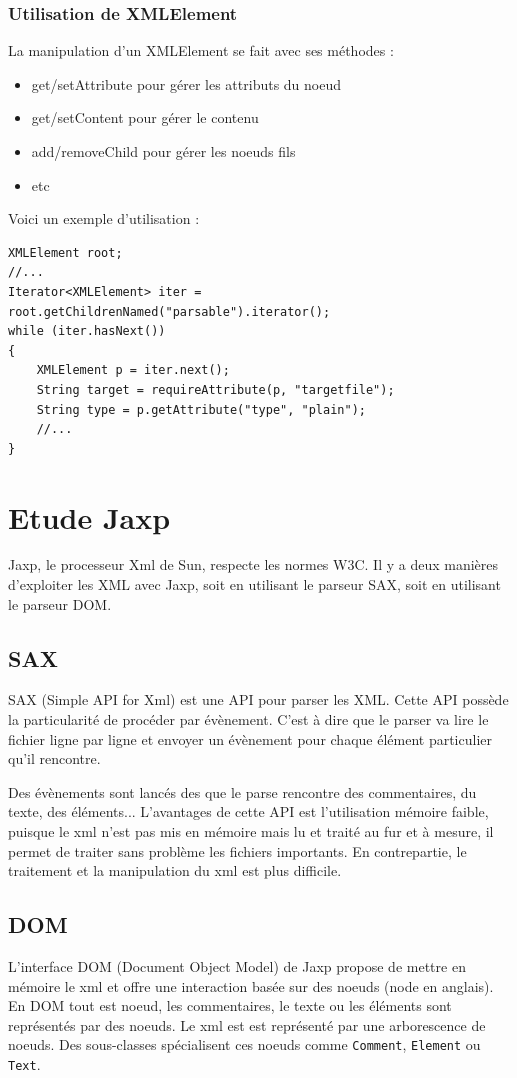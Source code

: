 \subsubsection{Utilisation de XMLElement}
La manipulation d'un XMLElement se fait avec ses méthodes :
\begin{itemize}
	\item get/setAttribute pour gérer les attributs du noeud
	\item get/setContent pour gérer le contenu
	\item add/removeChild pour gérer les noeuds fils
	\item etc
\end{itemize}
Voici un exemple d'utilisation :
\begin{lstlisting}
XMLElement root;
//...
Iterator<XMLElement> iter = root.getChildrenNamed("parsable").iterator();
while (iter.hasNext())
{
	XMLElement p = iter.next();
	String target = requireAttribute(p, "targetfile");
	String type = p.getAttribute("type", "plain");
	//...
}
\end{lstlisting}
\section{Etude Jaxp}
Jaxp, le processeur Xml de Sun, respecte les normes W3C.
Il y a deux manières d'exploiter les XML avec Jaxp, soit en utilisant le parseur SAX, soit en utilisant le parseur DOM.
\subsection{SAX}
SAX (Simple API for Xml) est une API pour parser les XML.
Cette API possède la particularité de procéder par évènement.
C'est à dire que le parser va lire le fichier ligne par ligne et envoyer un évènement pour chaque élément particulier qu'il rencontre.

Des évènements sont lancés des que le parse rencontre des commentaires, du texte, des éléments...
L'avantages de cette API est l'utilisation mémoire faible, puisque le xml n'est pas mis en mémoire mais lu et traité au fur et à mesure, il permet de traiter sans problème les fichiers importants.
En contrepartie, le traitement et la manipulation du xml est plus difficile.
\subsection{DOM}
L'interface DOM (Document Object Model) de Jaxp propose de mettre en mémoire le xml et offre une interaction basée sur des noeuds (node en anglais).
En DOM tout est noeud, les commentaires, le texte ou les éléments sont représentés par des noeuds.
Le xml est est représenté par une arborescence de noeuds.
Des sous-classes spécialisent ces noeuds comme \verb|Comment|, \verb|Element| ou \verb|Text|.

